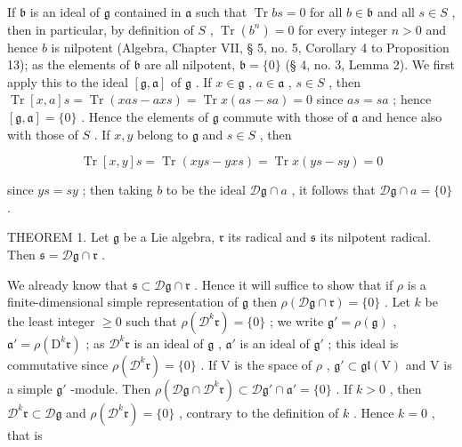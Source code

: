 If \(\mathfrak{b}\) is an ideal of \(\mathfrak{g}\) contained in \(\mathfrak{a}\) such that \(\operatorname{Tr}bs = 0\) for all \(b\in \mathfrak{b}\) and all \(s\in S\) , then in particular, by definition of \(S\) , \(\operatorname{Tr}(b^n) = 0\) for every integer \(n > 0\) and hence \(b\) is nilpotent (Algebra, Chapter VII, § 5, no. 5, Corollary 4 to Proposition 13); as the elements of \(\mathfrak{b}\) are all nilpotent, \(\mathfrak{b} = \{0\}\) (§ 4, no. 3, Lemma 2). We first apply this to the ideal \([\mathfrak{g},\mathfrak{a}]\) of \(\mathfrak{g}\) . If \(x\in \mathfrak{g}\) , \(a\in \mathfrak{a}\) , \(s\in S\) , then \(\operatorname{Tr}[x,a]s = \operatorname{Tr}(xas - axs) = \operatorname{Tr}x(as - sa) = 0\) since \(as = sa\) ; hence \([\mathfrak{g},\mathfrak{a}] = \{0\}\) . Hence the elements of \(\mathfrak{g}\) commute with those of \(\mathfrak{a}\) and hence also with those of \(S\) . If \(x,y\) belong to \(\mathfrak{g}\) and \(s\in S\) , then

\[
\operatorname{Tr} [ x, y ] s = \operatorname{Tr} (x y s - y x s) = \operatorname{Tr} x (y s - s y) = 0
\]

since \(ys = sy\) ; then taking \(b\) to be the ideal \(\mathcal{D}\mathfrak{g} \cap a\) , it follows that \(\mathcal{D}\mathfrak{g} \cap a = \{0\}\) .

THEOREM 1. Let \(\mathfrak{g}\) be a Lie algebra, \(\mathfrak{r}\) its radical and \(\mathfrak{s}\) its nilpotent radical. Then \(\mathfrak{s} = \mathcal{D}\mathfrak{g} \cap \mathfrak{r}\) .

We already know that \(\mathfrak{s} \subset \mathcal{D}\mathfrak{g} \cap \mathfrak{r}\) . Hence it will suffice to show that if \(\rho\) is a finite-dimensional simple representation of \(\mathfrak{g}\) then \(\rho(\mathcal{D}\mathfrak{g} \cap \mathfrak{r}) = \{0\}\) . Let \(k\) be the least integer \(\geqslant 0\) such that \(\rho(\mathcal{D}^{k}\mathfrak{r}) = \{0\}\) ; we write \(\mathfrak{g}' = \rho(\mathfrak{g})\) , \(\mathfrak{a}' = \rho(\mathrm{D}^k\mathfrak{r})\) ; as \(\mathcal{D}^k\mathfrak{r}\) is an ideal of \(\mathfrak{g}\) , \(\mathfrak{a}'\) is an ideal of \(\mathfrak{g}'\) ; this ideal is commutative since \(\rho(\mathcal{D}^{k}\mathfrak{r}) = \{0\}\) . If \(\mathrm{V}\) is the space of \(\rho\) , \(\mathfrak{g}' \subset \mathfrak{gl}(\mathrm{V})\) and \(\mathrm{V}\) is a simple \(\mathfrak{g}'\) -module. Then \(\rho(\mathcal{D}\mathfrak{g} \cap \mathcal{D}^k\mathfrak{r}) \subset \mathcal{D}\mathfrak{g}' \cap \mathfrak{a}' = \{0\}\) . If \(k > 0\) , then \(\mathcal{D}^k\mathfrak{r} \subset \mathcal{D}\mathfrak{g}\) and \(\rho(\mathcal{D}^k\mathfrak{r}) = \{0\}\) , contrary to the definition of \(k\) . Hence \(k = 0\) , that is

